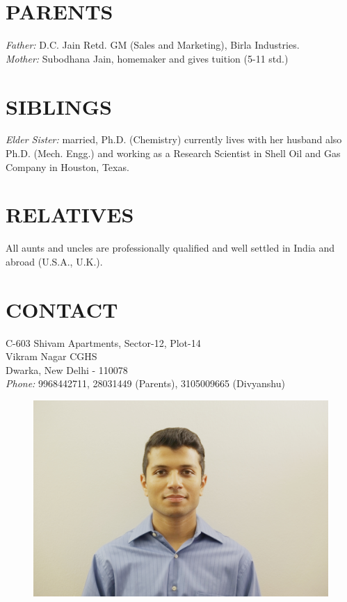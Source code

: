 \documentclass[margin, 10pt]{res} %
\begin{document}
\begin{resume}
\section{PARENTS}
{\sl Father:}  D.C. Jain Retd. GM (Sales and Marketing), Birla Industries.\\
{\sl Mother:}  Subodhana Jain, homemaker and gives tuition (5-11 std.)

 
 
\section{SIBLINGS}
{\sl Elder Sister:}  married, Ph.D. (Chemistry) currently lives with her husband also Ph.D. (Mech. Engg.) and working as a Research Scientist in Shell Oil and Gas Company in Houston, Texas.

 
 
\section{RELATIVES}
All aunts and uncles are professionally qualified and well settled in India and abroad (U.S.A., U.K.).

 
\section{CONTACT}
C-603 Shivam Apartments, Sector-12, Plot-14 \\
Vikram Nagar CGHS \\
Dwarka, New Delhi - 110078 \\
{\sl Phone:} 9968442711, 28031449 (Parents), 3105009665 (Divyanshu)

\begin{figure}[ht!]
\centering
\includegraphics[width=120mm]{djvisa.jpg}
\label{overflow}
\end{figure}


\end{resume}
\end{document}

